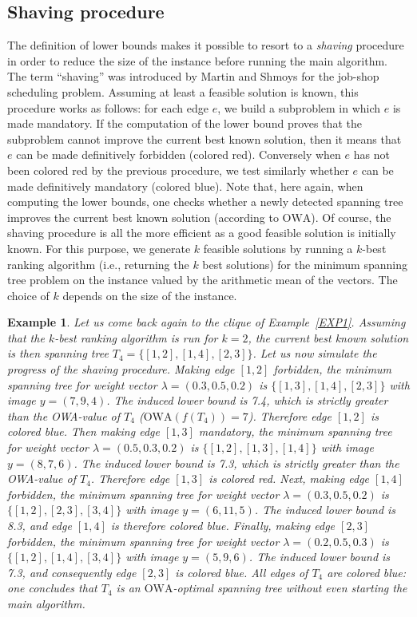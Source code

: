 \documentclass[final,3p,times]{elsarticle}
\newcommand{\owa}{\mbox{OWA}}
\newtheorem{example}{Example}
\begin{document}
\subsection{Shaving procedure}
The definition of lower bounds makes it possible to resort to a \emph{shaving} procedure in order to reduce the size of the instance before running the main algorithm. The term ``shaving'' was introduced by Martin and Shmoys \cite{MartinShmoys96} for the job-shop scheduling problem. Assuming at least a feasible solution is known, this procedure works as follows: for each edge $e$, we build a subproblem in which $e$ is made mandatory. If the computation of the lower bound proves that the subproblem cannot improve the current best known solution, then it means that $e$ can be made definitively forbidden (colored red). Conversely when $e$ has not been colored red by the previous procedure, we test similarly whether $e$ can be made definitively mandatory (colored blue). Note that, here again, when computing the lower bounds, one checks whether a newly detected spanning tree improves the current best known solution (according to $\owa$). Of course, the shaving procedure is all the more efficient as a good feasible solution is initially known. For this purpose, we generate $k$ feasible solutions by running a $k$-best ranking algorithm (i.e., returning the $k$ best solutions) for the minimum spanning tree problem on the instance valued by the arithmetic mean of the vectors. The choice of $k$ depends on the size of the instance.

\begin{example}
Let us come back again to the clique of Example~\ref{EXP1}. Assuming that
the $k$-best ranking algorithm is run for $k=2$, the current best known solution is then spanning tree $T_4 = \{[1,2],[1,4],[2,3]\}$. Let us now
simulate the progress of the shaving procedure. Making edge $[1,2]$
forbidden, the minimum spanning tree for weight vector $\lambda =
(0.3,0.5,0.2)$ is $\{[1,3],[1,4],[2,3]\}$ with image $y =
(7,9,4)$. The induced lower bound is 7.4, which is strictly greater
than the OWA-value of $T_4$ ($\owa(f(T_4))=7$). Therefore edge $[1,2]$
is colored blue. Then making edge $[1,3]$ mandatory, the minimum spanning
tree for weight vector $\lambda = (0.5,0.3,0.2)$ is
$\{[1,2],[1,3],[1,4]\}$ with image $y = (8,7,6)$. The induced lower
bound is 7.3, which is strictly greater than the OWA-value of
$T_4$. Therefore edge $[1,3]$ is colored red. 
Next, making edge $[1,4]$ forbidden, the minimum spanning tree for
weight vector $\lambda = (0.3,0.5,0.2)$ is $\{[1,2],[2,3],[3,4]\}$
with image $y = (6,11,5)$. The induced lower bound is 8.3, and edge
$[1,4]$ is therefore colored blue. Finally, making edge $[2,3]$
forbidden, the minimum spanning tree for weight vector $\lambda =
(0.2,0.5,0.3)$ is $\{[1,2],[1,4],[3,4]\}$ with image $y =
(5,9,6)$. The induced lower bound is 7.3, and consequently edge
$[2,3]$ is colored blue. All edges of $T_4$ are colored blue: one concludes
that $T_4$ is an $\owa$-optimal spanning tree without even starting the
main algorithm. 
\end{example}
\end{document}
